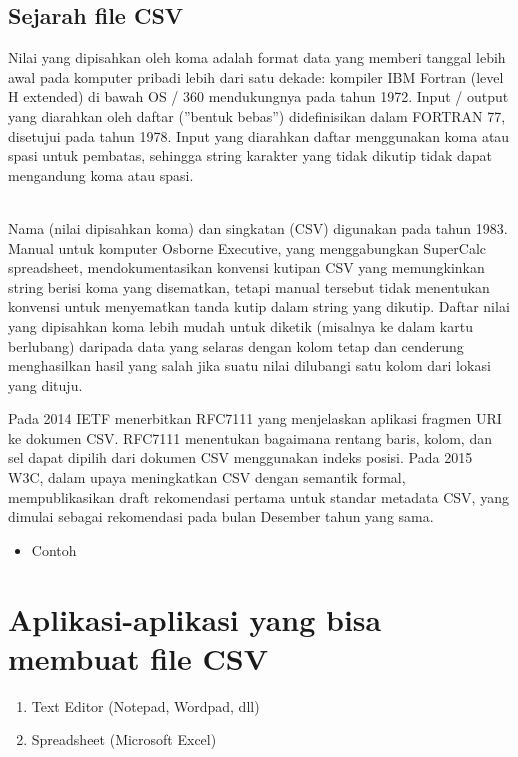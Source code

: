 \documentclass[12pt, times new roman]{report}
\begin{document}
\subsection{Sejarah file CSV}
\hspace{1cm}Nilai yang dipisahkan oleh koma adalah format data yang memberi tanggal lebih awal pada komputer pribadi lebih dari satu dekade: kompiler
IBM Fortran (level H extended) di bawah OS / 360 mendukungnya pada tahun 1972. Input / output yang diarahkan oleh daftar (”bentuk bebas”) didefinisikan dalam FORTRAN 77, disetujui pada tahun 1978. Input yang diarahkan daftar menggunakan koma atau spasi untuk pembatas, sehingga
string karakter yang tidak dikutip tidak dapat mengandung koma atau spasi.\\
\\
\par Nama (nilai dipisahkan koma) dan singkatan (CSV) digunakan pada
tahun 1983. Manual untuk komputer Osborne Executive, yang menggabungkan SuperCalc spreadsheet, mendokumentasikan konvensi kutipan CSV yang memungkinkan string berisi koma yang disematkan, tetapi manual tersebut tidak menentukan konvensi untuk menyematkan tanda kutip dalam string yang dikutip. Daftar nilai yang dipisahkan koma lebih mudah untuk diketik (misalnya ke dalam kartu berlubang) daripada data yang selaras dengan kolom tetap dan cenderung menghasilkan hasil yang salah jika suatu nilai dilubangi satu kolom dari lokasi yang dituju.\\
\par Pada 2014 IETF menerbitkan RFC7111 yang menjelaskan aplikasi fragmen URI ke dokumen CSV. RFC7111 menentukan bagaimana rentang
baris, kolom, dan sel dapat dipilih dari dokumen CSV menggunakan indeks posisi. Pada 2015 W3C, dalam upaya meningkatkan CSV dengan semantik formal, mempublikasikan draft rekomendasi pertama untuk standar metadata CSV, yang dimulai sebagai rekomendasi pada bulan Desember tahun yang sama.
\begin{itemize}
\item Contoh

\end{itemize}


\section{Aplikasi-aplikasi yang bisa membuat file CSV}
\begin{enumerate}
\item Text Editor (Notepad, Wordpad, dll)
\item Spreadsheet (Microsoft Excel)
\end{enumerate}
\end{document}
